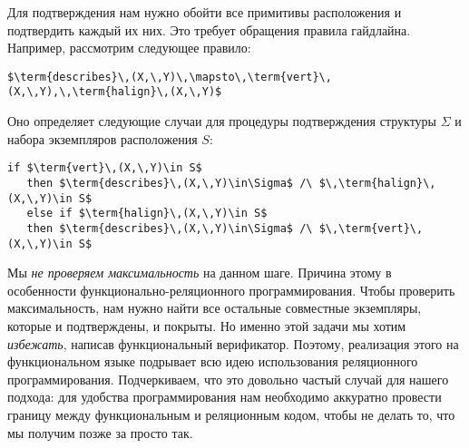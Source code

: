 
Для подтверждения нам нужно обойти все примитивы расположения и подтвердить каждый их них. Это требует обращения правила гайдлайна.
Например, рассмотрим следующее правило:

\begin{lstlisting}[language=ocanren,basicstyle=\small]
   $\term{describes}\,(X,\,Y)\,\mapsto\,\term{vert}\,(X,\,Y),\,\term{halign}\,(X,\,Y)$
\end{lstlisting}

Оно определяет следующие случаи для процедуры подтверждения структуры $\Sigma$ и набора экземпляров расположения  $S$:

\begin{lstlisting}[language=ocanren,basicstyle=\small]
   if $\term{vert}\,(X,\,Y)\in S$
   then $\term{describes}\,(X,\,Y)\in\Sigma$ /\ $\,\term{halign}\,(X,\,Y)\in S$
   else if $\term{halign}\,(X,\,Y)\in S$
   then $\term{describes}\,(X,\,Y)\in\Sigma$ /\ $\,\term{vert}\,(X,\,Y)\in S$
\end{lstlisting}

Мы \emph{не проверяем максимальность} на данном шаге. Причина этому в особенности функционально-реляционного программирования.
Чтобы проверить максимальность, нам нужно найти все остальные совместные экземпляры, которые и подтверждены, и покрыты.
Но именно этой задачи мы хотим \emph{избежать}, написав функциональный верификатор.
Поэтому, реализация этого на функциональном языке подрывает всю идею использования реляционного программирования.
Подчеркиваем, что это довольно частый случай для нашего подхода: для удобства программирования нам необходимо аккуратно провести границу между функциональным и реляционным кодом, чтобы не делать то, что мы получим позже за просто так.



